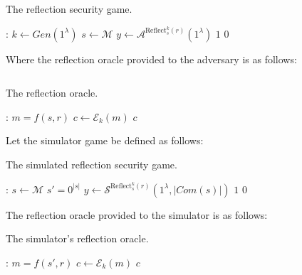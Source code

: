 \begin{algorithm}
    \caption{The reflection security game.}\label{alg:refsec-game}
    \begin{algorithmic}
        :
            \State $k \leftarrow Gen(1^\lambda)$
            \State $s \leftarrow \mathcal{M}$
            \State $y \leftarrow \mathcal{A}^{\text{Reflect}^{k}_s(r)}(1^\lambda)$
                \State \Return $1$
            \Else
                \State \Return $0$
            \EndIf
        \EndFunction
    \end{algorithmic}
\end{algorithm}

Where the reflection oracle provided to the adversary is as follows:

\begin{lstlisting}[texcl,mathescape,basicstyle=\small]
\end{lstlisting}

\begin{algorithm}
    \caption{The reflection oracle.}\label{alg:ref-oracle}
    \begin{algorithmic}
        :
            \State $m = f(s, r)$
            \State $c \leftarrow \mathcal{E}_{k}(m)$
            \State \Return $c$
        \EndFunction
    \end{algorithmic}
\end{algorithm}

Let the simulator game be defined as follows:

\begin{algorithm}
    \caption{The simulated reflection security game.}\label{alg:sim-refsec-game}
    \begin{algorithmic}
        :
            \State $s \leftarrow \mathcal{M}$
            \State $s' = 0^{|s|}$
            \State $y \leftarrow \mathcal{S}^{\text{Reflect}^{k}_s(r)}(1^\lambda, {|Com(s)|})$
                \State \Return $1$
            \Else
                \State \Return $0$
            \EndIf
        \EndFunction
    \end{algorithmic}
\end{algorithm}

The reflection oracle provided to the simulator is as follows:

\begin{algorithm}
    \caption{The simulator's reflection oracle.}\label{alg:sim-ref-oracle}
    \begin{algorithmic}
        :
            \State $m = f(s', r)$
            \State $c \leftarrow \mathcal{E}_{k}(m)$
            \State \Return $c$
        \EndFunction
    \end{algorithmic}
\end{algorithm}

